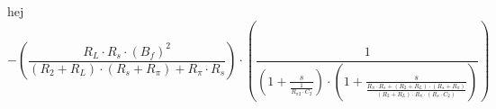 \documentclass[a4paper, 10pt]{article}
\author{NAME}
\begin{document}
hej
\begin{equation}
    -\left(\frac{R_L \cdot R_s \cdot (B_f)^2}{(R_2 + R_L) \cdot (R_s + R_{\pi}) + R_{\pi} \cdot R_s}\right) \cdot \left(\frac{1}{\left(1+\frac{s}{\frac{1}{R_{\pi2} \cdot C_2}}\right) \cdot \left(1+\frac{s}{\frac{R_{\pi} \cdot R_s + (R_2 + R_L) \cdot (R_s + R_{\pi})}{(R_2 + R_L) \cdot R_{\pi} \cdot (R_s \cdot C_2)}}\right)}\right)
\end{equation}
\end{document}
